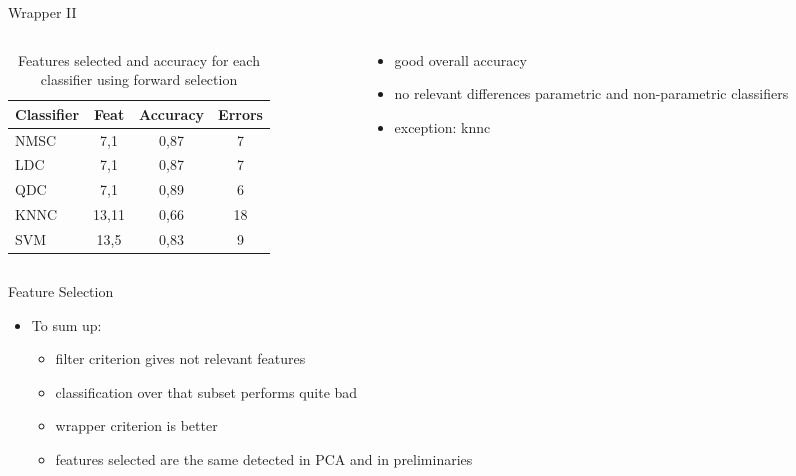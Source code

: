 \documentclass{beamer}
\begin{document}
\begin{frame}{Wrapper II}
\begin{columns}[t]
\begin{column}{.5\textwidth}
\begin{table}
\begin{tabular}{l || c | c | c  }
Classifier & Feat & Accuracy & Errors \\
\hline \hline
NMSC & 7,1 & 0,87 & 7  \\ 
LDC & 7,1 & 0,87 & 7 \\
QDC & 7,1 & 0,89 & 6 \\
KNNC & 13,11 & 0,66 & 18 \\
SVM & 13,5 & 0,83 & 9
\end{tabular}
\caption{{\scriptsize Features selected and accuracy for each classifier using forward selection}}
\end{table}

\end{column}
\begin{column}{.4\textwidth}
	\begin{itemize}
	\item{
	good overall accuracy
	}
	\item{
	no relevant differences parametric and non-parametric classifiers
	}
	\item{
	exception: knnc
	}
	\end{itemize}
\end{column}
\end{columns}
\end{frame}

\begin{frame}{Feature Selection}
  \begin{itemize}
  \item
    To sum up:
    \begin{itemize}
    \item
      filter criterion gives not relevant features
    \item
      classification over that subset performs quite bad
    \item
      wrapper criterion is better
      \item
      features selected are the same detected in PCA and in preliminaries
    \end{itemize}
  \end{itemize}
\end{frame}


\end{document}
